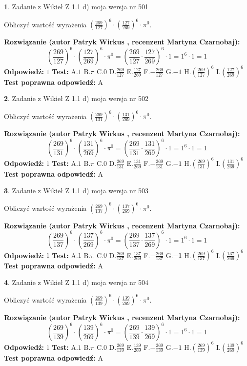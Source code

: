 \documentclass[12pt, a4paper]{article}
\theoremstyle{definition} %
\newtheorem{zad}{}
\newcommand{\zadStart}[1]{\begin{zad}#1\newline}
\newcommand{\zadStop}{\end{zad}}
\newcommand{\rozwStart}[2]{\noindent \textbf{Rozwiązanie (autor #1 , recenzent #2): }\newline}
\newcommand{\rozwStop}{\newline}
\newcommand{\odpStart}{\noindent \textbf{Odpowiedź:}\newline}
\newcommand{\odpStop}{\newline}
\newcommand{\testStart}{\noindent \textbf{Test:}\newline}
\newcommand{\testStop}{\newline}
\newcommand{\kluczStart}{\noindent \textbf{Test poprawna odpowiedź:}\newline}
\newcommand{\kluczStop}{\newline}
\begin{document}
\zadStart{Zadanie z Wikieł Z 1.1 d) moja wersja nr 501}

Obliczyć wartość wyrażenia $(\frac{269}{127})^{6} \cdot (\frac{127}{269})^{6} \cdot \pi^{0}$.
\zadStop
\rozwStart{Patryk Wirkus}{Martyna Czarnobaj}
$$(\frac{269}{127})^{6} \cdot (\frac{127}{269})^{6} \cdot \pi^{0} = (\frac{269}{127} \cdot \frac{127}{269})^{6} \cdot 1 = 1^{6} \cdot 1 = 1$$
\rozwStop
\odpStart
$1$
\odpStop
\testStart
A.$1$ B.$\pi$ C.$0$ D.$\frac{269}{127}$ E.$\frac{127}{269}$
F.$-\frac{269}{127}$ G.$-1$
H.$(\frac{269}{127})^{6}$
I.$(\frac{127}{269})^{6}$
\testStop
\kluczStart
A
\kluczStop



\zadStart{Zadanie z Wikieł Z 1.1 d) moja wersja nr 502}

Obliczyć wartość wyrażenia $(\frac{269}{131})^{6} \cdot (\frac{131}{269})^{6} \cdot \pi^{0}$.
\zadStop
\rozwStart{Patryk Wirkus}{Martyna Czarnobaj}
$$(\frac{269}{131})^{6} \cdot (\frac{131}{269})^{6} \cdot \pi^{0} = (\frac{269}{131} \cdot \frac{131}{269})^{6} \cdot 1 = 1^{6} \cdot 1 = 1$$
\rozwStop
\odpStart
$1$
\odpStop
\testStart
A.$1$ B.$\pi$ C.$0$ D.$\frac{269}{131}$ E.$\frac{131}{269}$
F.$-\frac{269}{131}$ G.$-1$
H.$(\frac{269}{131})^{6}$
I.$(\frac{131}{269})^{6}$
\testStop
\kluczStart
A
\kluczStop



\zadStart{Zadanie z Wikieł Z 1.1 d) moja wersja nr 503}

Obliczyć wartość wyrażenia $(\frac{269}{137})^{6} \cdot (\frac{137}{269})^{6} \cdot \pi^{0}$.
\zadStop
\rozwStart{Patryk Wirkus}{Martyna Czarnobaj}
$$(\frac{269}{137})^{6} \cdot (\frac{137}{269})^{6} \cdot \pi^{0} = (\frac{269}{137} \cdot \frac{137}{269})^{6} \cdot 1 = 1^{6} \cdot 1 = 1$$
\rozwStop
\odpStart
$1$
\odpStop
\testStart
A.$1$ B.$\pi$ C.$0$ D.$\frac{269}{137}$ E.$\frac{137}{269}$
F.$-\frac{269}{137}$ G.$-1$
H.$(\frac{269}{137})^{6}$
I.$(\frac{137}{269})^{6}$
\testStop
\kluczStart
A
\kluczStop



\zadStart{Zadanie z Wikieł Z 1.1 d) moja wersja nr 504}

Obliczyć wartość wyrażenia $(\frac{269}{139})^{6} \cdot (\frac{139}{269})^{6} \cdot \pi^{0}$.
\zadStop
\rozwStart{Patryk Wirkus}{Martyna Czarnobaj}
$$(\frac{269}{139})^{6} \cdot (\frac{139}{269})^{6} \cdot \pi^{0} = (\frac{269}{139} \cdot \frac{139}{269})^{6} \cdot 1 = 1^{6} \cdot 1 = 1$$
\rozwStop
\odpStart
$1$
\odpStop
\testStart
A.$1$ B.$\pi$ C.$0$ D.$\frac{269}{139}$ E.$\frac{139}{269}$
F.$-\frac{269}{139}$ G.$-1$
H.$(\frac{269}{139})^{6}$
I.$(\frac{139}{269})^{6}$
\testStop
\kluczStart
A
\kluczStop
\end{document}
